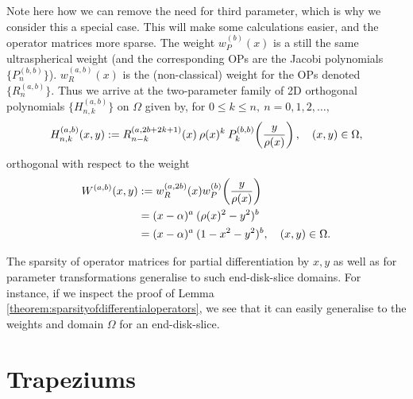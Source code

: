 \documentclass[11pt, oneside]{article}   	%
\newcommand{\hdop}{H}
\newcommand{\hdopnkab}{\hdop_{n,k}^{(a,b)}}
\newcommand{\Wab}{{W^{(a,b)}}}
\newcommand{\jac}{{P}}
\newcommand{\genjac}{R}
\newcommand{\genjacnmk}{\genjac_{n-k}}
\newcommand{\genjacw}{w_\genjac}
\newcommand{\jacw}{w_P}
\begin{document}
Note here how we can remove the need for third parameter, which is why we consider this a special case. This will make some calculations easier, and the operator matrices more sparse. The weight $\jacw^{(b)}(x)$ is a still the same ultraspherical weight (and the corresponding OPs are the Jacobi polynomials $\{\jac_n^{(b, b)}\}$). $\genjacw^{(a,b)}(x)$ is the (non-classical) weight for the OPs denoted $\{\genjac_n^{(a,b)}\}$. Thus we arrive at the two-parameter family of 2D orthogonal polynomials $\{\hdopnkab\}$ on $\Omega$ given by, for \(0 \le k \le n, \: n = 0,1,2,\dots,\)
\begin{align*}
	\hdopnkab(x,y) := \genjacnmk^{(a, 2b+2k+1)}(x) \: \rho(x)^k \: \jac_k^{(b,b)}\fpr(\frac{y}{\rho(x)}), \quad (x,y) \in \Omega, 
\end{align*}
orthogonal with respect to the weight
\begin{align*}
	\Wab(x,y) &:= \genjacw^{(a,2b)}(x) w^{(b)}_P\fpr(\frac{y}{\rho(x)}) \nonumber \\
	&= (x - \alpha)^{a} \: (\rho(x)^2 -y^2)^b \nonumber \\
	&= (x - \alpha)^{a} \: (1 - x^2 -y^2)^b , \quad (x,y) \in \Omega.
\end{align*}

The sparsity of operator matrices for partial differentiation by $x, y$ as well as for parameter transformations generalise to such end-disk-slice domains. For instance, if we inspect the proof of Lemma \ref{theorem:sparsityofdifferentialoperators}, we see that it can easily generalise to the weights and domain $\Omega$ for an end-disk-slice.


\section{Trapeziums}\label{Appendix:Trapezium}
\end{document}
